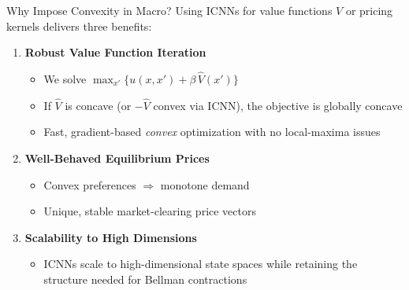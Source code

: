 \documentclass[10pt,english,aspectratio=169]{beamer}
\begin{document}
\begin{frame}{Why Impose Convexity in Macro?}
\small
Using ICNNs for value functions $V$ or pricing kernels delivers three benefits:

\begin{enumerate}
  \item \textbf{Robust Value Function Iteration}
    \begin{itemize}
      \item We solve $\max_{x'}\{u(x,x') + \beta\, \hat{V}(x')\}$
      \item If $\hat{V}$ is concave (or $-\hat{V}$ convex via ICNN), the objective is globally concave
      \item Fast, gradient-based \emph{convex} optimization with no local-maxima issues
    \end{itemize}

  \item \textbf{Well-Behaved Equilibrium Prices}
    \begin{itemize}
      \item Convex preferences $\Rightarrow$ monotone demand
      \item Unique, stable market-clearing price vectors
    \end{itemize}

  \item \textbf{Scalability to High Dimensions}
    \begin{itemize}
      \item ICNNs scale to high-dimensional state spaces while retaining the structure needed for Bellman contractions
    \end{itemize}
\end{enumerate}
\end{frame}
\end{document}
